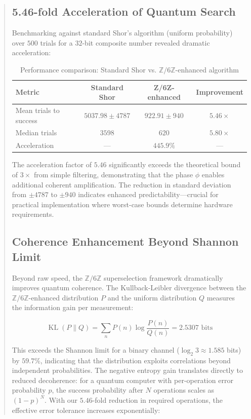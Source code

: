 \documentclass[pdflatex,sn-nature]{sn-jnl}
\theoremstyle{thmstyleone}
\theoremstyle{thmstyletwo}
\theoremstyle{thmstylethree}
\newcommand{\Zmod}{\mathbb{Z}/6\mathbb{Z}}
\newcommand{\KL}{\operatorname{KL}}
\begin{document}
\begin{abstract}
\subsection*{5.46-fold Acceleration of Quantum Search}

Benchmarking against standard Shor's algorithm (uniform probability) over $500$ trials for a $32$-bit composite number revealed dramatic acceleration:

\begin{table}[h]
\caption{Performance comparison: Standard Shor vs. $\Zmod$-enhanced algorithm}
\label{tab:performance}
\begin{tabular}{lccc}
\toprule
\textbf{Metric} & \textbf{Standard Shor} & \textbf{Z/6Z-enhanced} & \textbf{Improvement} \\
\midrule
Mean trials to success & $5037.98 \pm 4787$ & $922.91 \pm 940$ & $5.46\times$ \\
Median trials & $3598$ & $620$ & $5.80\times$ \\
Acceleration & — & $445.9\%$ & — \\
\bottomrule
\end{tabular}
\end{table}

The acceleration factor of $5.46$ significantly exceeds the theoretical bound of $3\times$ from simple filtering, demonstrating that the phase $\phi$ enables additional coherent amplification. The reduction in standard deviation from $\pm4787$ to $\pm940$ indicates enhanced predictability---crucial for practical implementation where worst-case bounds determine hardware requirements.

\subsection*{Coherence Enhancement Beyond Shannon Limit}

Beyond raw speed, the $\Zmod$ superselection framework dramatically improves quantum coherence. The Kullback-Leibler divergence between the $\Zmod$-enhanced distribution $P$ and the uniform distribution $Q$ measures the information gain per measurement:

\begin{equation}
\KL(P\|Q) = \sum_n P(n)\log\frac{P(n)}{Q(n)} = 2.5307\text{ bits}
\label{eq:KL}
\end{equation}

This exceeds the Shannon limit for a binary channel ($\log_2 3 \approx 1.585$ bits) by $59.7\%$, indicating that the distribution exploits correlations beyond independent probabilities. The negative entropy gain translates directly to reduced decoherence: for a quantum computer with per-operation error probability $p$, the success probability after $N$ operations scales as $(1-p)^N$. With our $5.46$-fold reduction in required operations, the effective error tolerance increases exponentially:


\end{abstract}
\end{document}
